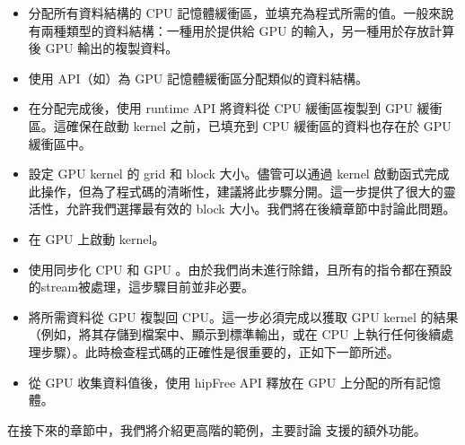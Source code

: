 \begin{itemize}
    \item 分配所有資料結構的 CPU 記憶體緩衝區，並填充為程式所需的值。一般來說有兩種類型的資料結構：一種用於提供給 GPU 的輸入，另一種用於存放計算後 GPU 輸出的複製資料。
    \item 使用  API（如）為 GPU 記憶體緩衝區分配類似的資料結構。
    \item 在分配完成後，使用  runtime API 將資料從 CPU 緩衝區複製到 GPU 緩衝區。這確保在啟動 kernel 之前，已填充到 CPU 緩衝區的資料也存在於 GPU 緩衝區中。
    \item 設定 GPU kernel 的 grid 和 block 大小。儘管可以通過 kernel 啟動函式完成此操作，但為了程式碼的清晰性，建議將此步驟分開。這一步提供了很大的靈活性，允許我們選擇最有效的 block 大小。我們將在後續章節中討論此問題。
    \item 在 GPU 上啟動 kernel。
    \item 使用同步化 CPU 和 GPU 。由於我們尚未進行除錯，且所有的指令都在預設的stream被處理，這步驟目前並非必要。
    \item 將所需資料從 GPU 複製回 CPU。這一步必須完成以獲取 GPU kernel 的結果（例如，將其存儲到檔案中、顯示到標準輸出，或在 CPU 上執行任何後續處理步驟）。此時檢查程式碼的正確性是很重要的，正如下一節所述。
    \item 從 GPU 收集資料值後，使用 hipFree API 釋放在 GPU 上分配的所有記憶體。
\end{itemize}

在接下來的章節中，我們將介紹更高階的範例，主要討論  支援的額外功能。